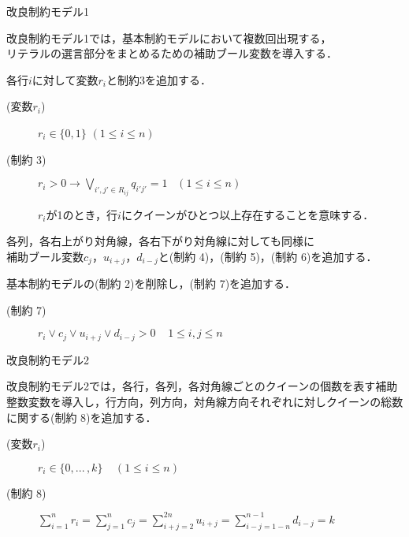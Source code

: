 \begin{frame}{改良制約モデル1}
 \begin{alertblock}{}
  改良制約モデル1では，基本制約モデルにおいて複数回出現する，\\リテラルの選言部分をまとめるための補助ブール変数を導入する．
 \end{alertblock}
 \begin{block}{}
  各行$i$に対して変数$r_{i}$と制約3を追加する．
  \begin{description}
   \item[{\color{black} (変数$r_{i}$})] $r_{i} \in \{0,1\}$  $(1 \leq i \leq n)$
   \item[{\color{black} (制約 3)}] $r_{i}>0 \rightarrow \bigvee\limits_{i',j' 
	      \in R_{ij}}q_{i'j'} = 1\;\;\;(1\leq i \leq n)$ \par
	      $r_{i}$が1のとき，行$i$にクイーンがひとつ以上存在することを意味する．
  \end{description}
 各列，各右上がり対角線，各右下がり対角線に対しても同様に\\補助ブール変数$c_j$，$u_{i+j}$，$d_{i-j}$と(制約 4)，(制約 5)，(制約 6)を追加する．
 \end{block}
 \begin{block}{}
  基本制約モデルの(制約 2)を削除し，(制約 7)を追加する．
  \begin{description}
   \item[{\color{black} (制約 7)}] $r_{i} \vee c_{j} \vee u_{i+j} \vee d_{i-j} > 0 \;\;\;\;1\leq i,j \leq n$
  \end{description}
 \end{block}
\end{frame}

%
%

\begin{frame}{改良制約モデル2}
 \begin{alertblock}{}
  改良制約モデル2では，各行，各列，各対角線ごとのクイーンの個数を表す補助整数変数を導入し，行方向，列方向，対角線方向それぞれに対しクイーンの総数に関する(制約 8)を追加する．
 \end{alertblock}
 \begin{block}{}
  \begin{description}
   \item[{\color{black} (変数$r_{i}$)}] $r_{i} \in \{0,...\,,k\} \;\;\;\; (1 \leq i \leq n)$
   \item[{\color{black} (制約 8)}] $\sum\limits_{i=1}^{n}r_{i} = \sum\limits_{j=1}^{n}c_{j} = \sum\limits_{i+j=2}^{2n}u_{i+j} = \sum\limits_{i-j=1-n}^{n-1}d_{i-j} = k$
  \end{description}
 \end{block}
\end{frame}

\backupend